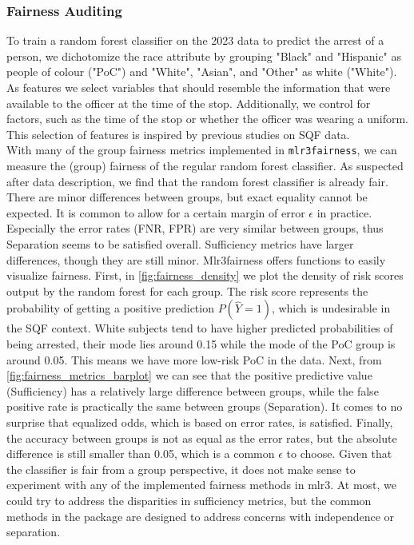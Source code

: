 \subsubsection*{Fairness Auditing}
To train a random forest classifier on the 2023 data to predict the arrest of a person, we dichotomize the race attribute by grouping "Black" and "Hispanic" as people of colour ("PoC") and "White", "Asian", and "Other" as white ("White").
As features we select variables that should resemble the information that were available to the officer at the time of the stop. Additionally, we control for factors, such as the time of the stop or whether the officer was wearing a uniform. This selection of features is inspired by previous studies on SQF data. \\
With many of the group fairness metrics implemented in \texttt{mlr3fairness}, we can measure the (group) fairness of the regular random forest classifier.
As suspected after data description, we find that the random forest classifier is already fair. There are minor differences between groups, but exact equality cannot be expected. It is common to allow for a certain margin of error $\epsilon$ in practice.
Especially the error rates (FNR, FPR) are very similar between groups, thus Separation seems to be satisfied overall. Sufficiency metrics have larger differences, though they are still minor. Mlr3fairness offers functions to easily visualize fairness. First, in \autoref{fig:fairness_density} we plot the density of risk scores output by the random forest for each group.
The risk score represents the probability of getting a positive prediction $P(\hat{Y} = 1)$, which is undesirable in the SQF context. White subjects tend to have higher predicted probabilities of being arrested, their mode lies around 0.15 while the mode of the PoC group is around 0.05. This means we have more low-risk PoC in the data. Next, from \autoref{fig:fairness_metrics_barplot} we can see that the positive predictive value (Sufficiency) has a relatively large difference between groups,
while the false positive rate is practically the same between groups (Separation). It comes to no surprise that equalized odds, which is based on error rates, is satisfied. Finally, the accuracy between groups is not as equal as the error rates, but the absolute difference is still smaller than 0.05, which is a common $\epsilon$ to choose.
Given that the classifier is fair from a group perspective, it does not make sense to experiment with any of the implemented fairness methods in mlr3. At most, we could try to address the disparities in sufficiency metrics, but the common methods in the package are designed to address concerns with independence or separation. \\
